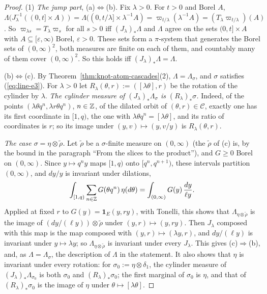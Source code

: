 \begin{proof}
(1) \emph{The jump part}, (a)$\Leftrightarrow$(b). Fix $\lambda > 0$. For $t > 0$ and Borel $A$,
$\Lambda(J_\lambda^{-1}((0,t] \times A)) = \Lambda((0,t/\lambda] \times \lambda^{-1}A)
= \varpi_{t/\lambda}(\lambda^{-1}A) = (T_\lambda\varpi_{t/\lambda})(A)$. So
$\varpi_{\lambda s} = T_\lambda\varpi_s$ for all $s > 0$ iff $(J_\lambda)_*\Lambda$ and $\Lambda$
agree on the sets $(0,t] \times A$ with $A \subseteq [\varepsilon,\infty)$ Borel, $\varepsilon > 0$.
These sets form a $\pi$-system that generates the Borel sets of $(0,\infty)^2$, both measures are
finite on each of them, and countably many of them cover $(0,\infty)^2$. So this holds iff
$(J_\lambda)_*\Lambda = \Lambda$.

(b)$\Leftrightarrow$(c). By Theorem~\ref{thm:knot-atom-cascades}(2), $\Lambda = \Lambda_\sigma$,
and $\sigma$ satisfies (\ref{eq:line-e3}). For $\lambda > 0$ let $R_\lambda(\theta, r) := ([\lambda\theta], r)$
be the rotation of the cylinder by $\lambda$. \emph{The cylinder measure of
$(J_\lambda)_*\Lambda_\sigma$ is $(R_\lambda)_*\sigma$.} Indeed, of the points
$(\lambda\theta q^n, \lambda r\theta q^n)$, $n \in \mathbb{Z}$, of the dilated orbit of
$(\theta, r) \in \mathcal{C}$, exactly one has its first coordinate in $[1,q)$, the one with
$\lambda\theta q^n = [\lambda\theta]$, and its ratio of coordinates is $r$; so its image under
$(y,v) \mapsto (y, v/y)$ is $R_\lambda(\theta, r)$.

\emph{The case $\sigma = \eta \otimes \tilde\rho$.} Let $\tilde\rho$ be a $\sigma$-finite measure
on $(0,\infty)$ (the $\tilde\rho$ of (c) is, by the bound in the paragraph ``From the slices to the
product''), and $G \ge 0$ Borel on $(0,\infty)$. Since $y \mapsto q^ny$ maps $[1,q)$ onto
$[q^n, q^{n+1})$, these intervals partition $(0,\infty)$, and $dy/y$ is invariant under dilations,
\[
  \int_{[1,q)}\sum_{n \in \mathbb{Z}}G(\theta q^n)\,\eta(d\theta) = \int_{(0,\infty)}G(y)\,\frac{dy}{\ell y} .
\]
Applied at fixed $r$ to $G(y) = \mathbf 1_E(y, ry)$, with Tonelli, this shows that
$\Lambda_{\eta \otimes \tilde\rho}$ is the image of $(dy/(\ell y)) \otimes \tilde\rho$ under
$(y,r) \mapsto (y, ry)$. Then $J_\lambda$ composed with this map is the map composed with
$(y,r) \mapsto (\lambda y, r)$, and $dy/(\ell y)$ is invariant under $y \mapsto \lambda y$; so
$\Lambda_{\eta \otimes \tilde\rho}$ is invariant under every $J_\lambda$. This gives
(c)$\Rightarrow$(b), and, as $\Lambda = \Lambda_\sigma$, the description of $\Lambda$ in the
statement. It also shows that $\eta$ is invariant under every rotation: for
$\sigma_0 := \eta \otimes \delta_1$, the cylinder measure of $(J_\lambda)_*\Lambda_{\sigma_0}$ is
both $\sigma_0$ and $(R_\lambda)_*\sigma_0$; the first marginal of $\sigma_0$ is $\eta$, and that of
$(R_\lambda)_*\sigma_0$ is the image of $\eta$ under $\theta \mapsto [\lambda\theta]$.


\end{proof}
